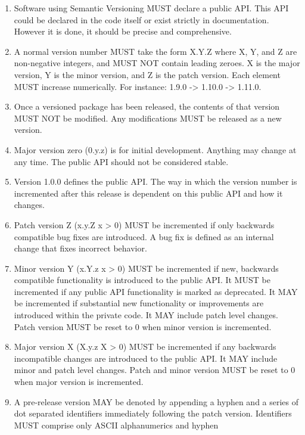 \documentclass[a4paper,12pt,notitlepage,twoside,openright]{article}
\begin{document}
\begin{enumerate}
\def\labelenumi{\arabic{enumi}.}
\item
  Software using Semantic Versioning MUST declare a public API. This API
  could be declared in the code itself or exist strictly in
  documentation. However it is done, it should be precise and
  comprehensive.
\item
  A normal version number MUST take the form X.Y.Z where X, Y, and Z are
  non-negative integers, and MUST NOT contain leading zeroes. X is the
  major version, Y is the minor version, and Z is the patch version.
  Each element MUST increase numerically. For instance: 1.9.0
  -\textgreater{} 1.10.0 -\textgreater{} 1.11.0.
\item
  Once a versioned package has been released, the contents of that
  version MUST NOT be modified. Any modifications MUST be released as a
  new version.
\item
  Major version zero (0.y.z) is for initial development. Anything may
  change at any time. The public API should not be considered stable.
\item
  Version 1.0.0 defines the public API. The way in which the version
  number is incremented after this release is dependent on this public
  API and how it changes.
\item
  Patch version Z (x.y.Z \textbar{} x \textgreater{} 0) MUST be
  incremented if only backwards compatible bug fixes are introduced. A
  bug fix is defined as an internal change that fixes incorrect
  behavior.
\item
  Minor version Y (x.Y.z \textbar{} x \textgreater{} 0) MUST be
  incremented if new, backwards compatible functionality is introduced
  to the public API. It MUST be incremented if any public API
  functionality is marked as deprecated. It MAY be incremented if
  substantial new functionality or improvements are introduced within
  the private code. It MAY include patch level changes. Patch version
  MUST be reset to 0 when minor version is incremented.
\item
  Major version X (X.y.z \textbar{} X \textgreater{} 0) MUST be
  incremented if any backwards incompatible changes are introduced to
  the public API. It MAY include minor and patch level changes. Patch
  and minor version MUST be reset to 0 when major version is
  incremented.
\item
  A pre-release version MAY be denoted by appending a hyphen and a
  series of dot separated identifiers immediately following the patch
  version. Identifiers MUST comprise only ASCII alphanumerics and hyphen

\end{enumerate}
\end{document}
